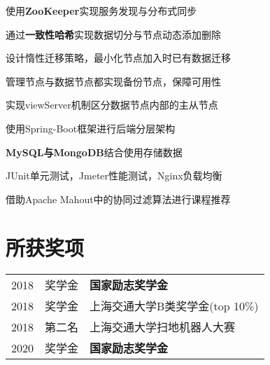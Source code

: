 \documentclass[]{deedy-resume-openfont}
\begin{document}
\begin{minipage}[t]{0.73\textwidth}
\begin{tightemize}
	\item 使用\textbf{ZooKeeper}实现服务发现与分布式同步
	\item 通过\textbf{一致性哈希}实现数据切分与节点动态添加删除
	\item 设计惰性迁移策略，最小化节点加入时已有数据迁移
	\item 管理节点与数据节点都实现备份节点，保障可用性
	\item 实现viewServer机制区分数据节点内部的主从节点
\end{tightemize}
\sectionsep
\sectionsep

\begin{tightemize}
\item 使用Spring-Boot框架进行后端分层架构
\item  \textbf{MySQL与MongoDB}结合使用存储数据
\item JUnit单元测试，Jmeter性能测试，Nginx负载均衡
\item 借助Apache Mahout中的协同过滤算法进行课程推荐
\end{tightemize}
\sectionsep
\sectionsep





\section{所获奖项} 
\begin{tabular}{rll}
2018         & 奖学金  & \textbf{国家励志奖学金} \\
2018	     & 奖学金  & 上海交通大学B类奖学金(top 10\%) \\
2018	     & 第二名  & 上海交通大学扫地机器人大赛 \\
2020         & 奖学金  & \textbf{国家励志奖学金}  \\
\end{tabular}
\sectionsep


% 
% 

\end{minipage} 
\end{document}

